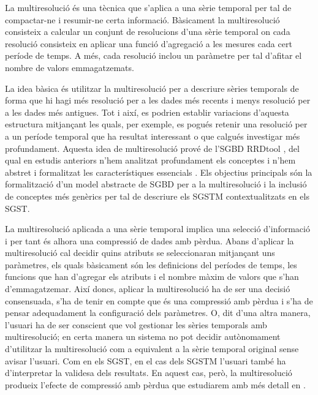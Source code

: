 La multiresolució és una tècnica que s'aplica a una sèrie temporal
per tal de compactar-ne i resumir-ne certa informació.  Bàsicament la
multiresolució consisteix a calcular un conjunt de resolucions d'una
sèrie temporal on cada resolució consisteix en aplicar una funció
d'agregació a les mesures cada cert període de temps. A més, cada
resolució inclou un paràmetre per tal d'afitar el nombre de valors
emmagatzemats.  

La idea bàsica és utilitzar la multiresolució per a descriure sèries
temporals de forma que hi hagi més resolució per a les dades més
recents i menys resolució per a les dades més antigues. Tot i així, es
podrien establir variacions d'aquesta estructura mitjançant les quals,
per exemple, es pogués retenir una resolució per a un període temporal
que ha resultat interessant o que calgués investigar més profundament.
Aquesta idea de multiresolució prové de l'\gls{SGBD}
RRDtool \parencite{rrdtool}, del qual en estudis anteriors n'hem
analitzat profundament els conceptes i n'hem abstret i formalitzat les
característiques essencials \parencite{llusa11:tfm,llusa12:ptd}.  Els
objectius principals són la formalització d'un model abstracte de
\gls{SGBD} per a la multiresolució i la inclusió de conceptes més
genèrics per tal de descriure els \gls{SGSTM} contextualitzats en els
\gls{SGST}.





La multiresolució aplicada a una sèrie temporal implica una selecció
d'informació i per tant és alhora una compressió de dades amb
pèrdua. Abans d'aplicar la multiresolució cal decidir quins atributs
se seleccionaran mitjançant uns paràmetres, els quals bàsicament són les
definicions del períodes de temps, les funcions que han d'agregar els atributs
i el nombre màxim de valors que s'han d'emmagatzemar.  Així doncs,
aplicar la multiresolució ha de ser una decisió consensuada, s'ha de
tenir en compte que és una compressió amb pèrdua i s'ha de pensar
adequadament la configuració dels paràmetres. O, dit d'una altra
manera, l'usuari ha de ser conscient que vol gestionar les sèries
temporals amb multiresolució; en certa manera un sistema no pot
decidir autònomament d'utilitzar la multiresolució com a equivalent a
la sèrie temporal original sense avisar l'usuari.
%
Com en els \gls{SGST}, en el cas dels \gls{SGSTM} l'usuari també ha
d'interpretar la validesa dels resultats. En aquest cas, però, la
multiresolució produeix l'efecte de compressió amb pèrdua que
estudiarem amb més detall en
.



